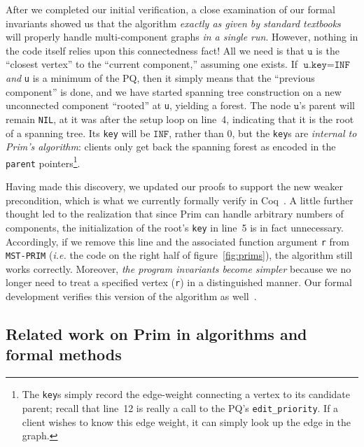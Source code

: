 After we completed our initial verification, a close examination of our formal invariants showed us that the algorithm \emph{exactly as given by standard textbooks} will properly handle multi-component graphs \textit{in a single run}.    However, nothing in the code itself relies upon this connectedness fact!  All we need is that $\texttt{u}$ is the ``closest vertex'' to the ``current component,'' assuming one exists.  If $\texttt{u.key}=\texttt{INF}$ \emph{and} \texttt{u} is a minimum of the PQ, then it simply means that the ``previous component'' is done, and we have started spanning tree construction on a new unconnected component ``rooted'' at \texttt{u}, yielding a forest.  The node $\texttt{u}$'s parent will remain \texttt{NIL}, at it was after the setup loop on line~4, indicating that it is the root of a spanning tree.  Its \texttt{key} will be $\texttt{INF}$, rather than $0$, but the \texttt{key}s are \emph{internal to Prim's algorithm}: clients only get back the spanning forest as encoded in the \texttt{parent} pointers\footnote{The \texttt{key}s simply record the edge-weight connecting a vertex to its candidate parent; recall that line~12 is really a call to the PQ's \texttt{edit\_priority}.  If a client wishes to know this edge weight, it can simply look up the edge in the graph.}.

Having made this discovery, we updated our proofs to support the new weaker precondition, which is what we currently formally verify in Coq~\cite{Coq}.
A little further thought led to the realization that since Prim can handle arbitrary numbers of components, the initialization of the root's \texttt{key} in line~5 is in fact unnecessary.  Accordingly, if we remove this line and the associated function argument \texttt{r} from \texttt{MST-PRIM} (\emph{i.e.} the code on the right half of figure~\ref{fig:prims}), the algorithm still works correctly.  Moreover, \emph{the program invariants become simpler} because we no longer need to treat a specified vertex (\texttt{r}) in a distinguished manner.  Our formal development verifies this version of the algorithm as well~\cite{anonrepo}.

\subsection{Related work on Prim in algorithms and formal methods}
\label{sec:relworkprim}

